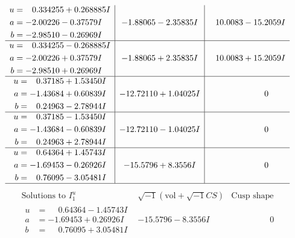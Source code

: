 \documentclass[1p]{elsarticle_modified}
\theoremstyle{definition}
\newcommand{\I}{\sqrt{-1}}
\begin{document}
$$\begin{array}{c|c|c}
\begin{aligned}
u &= \phantom{-}0.334255 + 0.268885 I \\
a &= -2.00226 - 0.37579 I \\
b &= -2.98510 - 0.26969 I\end{aligned}
 & -1.88065 - 2.35835 I & \phantom{-}10.0083 - 15.2059 I \\ \hline\begin{aligned}
u &= \phantom{-}0.334255 - 0.268885 I \\
a &= -2.00226 + 0.37579 I \\
b &= -2.98510 + 0.26969 I\end{aligned}
 & -1.88065 + 2.35835 I & \phantom{-}10.0083 + 15.2059 I \\ \hline\begin{aligned}
u &= \phantom{-}0.37185 + 1.53450 I \\
a &= -1.43684 + 0.60839 I \\
b &= \phantom{-}0.24963 - 2.78944 I\end{aligned}
 & -12.72110 + 1.04025 I & \phantom{-0.000000 } 0 \\ \hline\begin{aligned}
u &= \phantom{-}0.37185 - 1.53450 I \\
a &= -1.43684 - 0.60839 I \\
b &= \phantom{-}0.24963 + 2.78944 I\end{aligned}
 & -12.72110 - 1.04025 I & \phantom{-0.000000 } 0 \\ \hline\begin{aligned}
u &= \phantom{-}0.64364 + 1.45743 I \\
a &= -1.69453 - 0.26926 I \\
b &= \phantom{-}0.76095 - 3.05481 I\end{aligned}
 & -15.5796 + 8.3556 I & \phantom{-0.000000 } 0\\
 \hline 
 \end{array}$$\newpage$$\begin{array}{c|c|c}  
\text{Solutions to }I^u_{1}& \I (\text{vol} + \sqrt{-1}CS) & \text{Cusp shape}\\
 \hline 
\begin{aligned}
u &= \phantom{-}0.64364 - 1.45743 I \\
a &= -1.69453 + 0.26926 I \\
b &= \phantom{-}0.76095 + 3.05481 I\end{aligned}
 & -15.5796 - 8.3556 I & \phantom{-0.000000 } 0 \\ \hline\begin{aligned}

\end{aligned}
\end{array}$$
\end{document}
